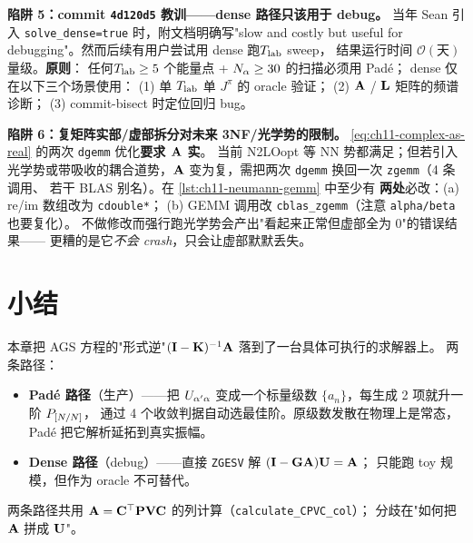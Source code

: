 \begin{pitfallbox}
\medskip
\textbf{陷阱 5：commit \texttt{4d120d5} 教训——dense 路径只该用于 debug。}
当年 Sean 引入 \texttt{solve\_dense=true} 时，附文档明确写"slow and costly
but useful for debugging"。然而后续有用户尝试用 dense 跑\({T_{\text{lab}}}\) sweep，
结果运行时间 \(\mathcal{O}(\text{天})\) 量级。\textbf{原则}：
任何\({T_{\text{lab}}} \ge 5\) 个能量点 + \(N_\alpha \ge 30\) 的扫描必须用 Padé；
dense 仅在以下三个场景使用：
(1) 单 \({T_{\text{lab}}}\) 单 \(J^\pi\) 的 oracle 验证；
(2) \(\mathbf{A}\) / \(\mathbf{L}\) 矩阵的频谱诊断；
(3) commit-bisect 时定位回归 bug。

\medskip
\textbf{陷阱 6：复矩阵实部/虚部拆分对未来 3NF/光学势的限制。}
\cref{eq:ch11-complex-as-real} 的两次 \texttt{dgemm} 优化\textbf{要求 \(\mathbf{A}\) 实}。
当前 N2LOopt 等 NN 势都满足；但若引入光学势或带吸收的耦合道势，\(\mathbf{A}\)
变为复，需把两次 \texttt{dgemm} 换回一次 \texttt{zgemm}（4 条调用、
若干 BLAS 别名）。在 \cref{lst:ch11-neumann-gemm} 中至少有
\textbf{两处}必改：(a) re/im 数组改为 \texttt{cdouble*}；
(b) GEMM 调用改 \texttt{cblas\_zgemm}（注意 \texttt{alpha/beta} 也要复化）。
不做修改而强行跑光学势会产出"看起来正常但虚部全为 0"的错误结果——
更糟的是它\emph{不会 crash}，只会让虚部默默丢失。
\end{pitfallbox}

\section{小结}
\label{sec:ch11-summary}

本章把 AGS 方程的"形式逆"\((\mathbf{I} - \mathbf{K})^{-1}\mathbf{A}\) 落到了一台具体可执行的求解器上。
两条路径：
\begin{itemize}
  \item \textbf{Padé 路径}（生产）——把 \(U_{\alpha'\alpha}\)
        变成一个标量级数 \(\{a_n\}\)，每生成 2 项就升一阶 \(P_{[N/N]}\)，
        通过 4 个收敛判据自动选最佳阶。原级数发散在物理上是常态，
        Padé 把它解析延拓到真实振幅。
  \item \textbf{Dense 路径}（debug）——直接 \texttt{ZGESV} 解 \((\mathbf{I} - \mathbf{G}\mathbf{A})\mathbf{U} = \mathbf{A}\)；
        只能跑 toy 规模，但作为 oracle 不可替代。
\end{itemize}
两条路径共用 \(\mathbf{A} = \mathbf{C}^\top\mathbf{P}\mathbf{V}\mathbf{C}\) 的列计算（\texttt{calculate\_CPVC\_col}）；
分歧在"如何把 \(\mathbf{A}\) 拼成 \(\mathbf{U}\)"。

